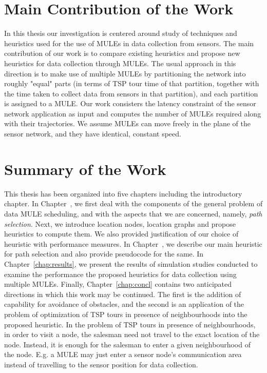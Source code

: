 \section{Main Contribution of the Work}
In this thesis our investigation is centered around study of techniques and heuristics used for the use of MULEs in data collection from sensors. The main contribution of our work is to compare existing heuristics and propose new heuristics for data collection through MULEs. The usual approach in this direction is to make use of multiple MULEs by partitioning the network into roughly "equal" parts (in terms of TSP tour time of that partition, together with the time taken to collect data from sensors in that partition), and each partition is assigned to a MULE. Our work consisters the latency constraint of the sensor network application as input and computes the number of MULEs required along with their trajectories. We assume MULEs can move freely in the plane of the sensor network, and they have identical, constant speed.

\section{Summary of the Work}
This thesis has been organized into five chapters including the 
introductory chapter. In Chapter~, we first deal with the components of the general problem of data MULE scheduling, and with the aspects that we are concerned, namely, {\em path selection}. Next, we introduce location nodes, location graphs and propose heuristics to compute them. We also provided justification of our choice of heuristic with performance measures. In Chapter~, we describe our main heuristic for path selection and also provide pseudocode for the same. 
In Chapter~\ref{chap:results}, we present the results of simulation studies conducted to examine the performance the proposed heuristics for data collection using multiple MULEs. Finally, 
Chapter~\ref{chap:concl} contains two anticipated directions in which this work may be continued. 
The first is the addition of capability for avoidance of obstacles, and the second is an application of the problem of optimization of TSP tours in presence of neighbourhoods into the proposed heuristic. In the problem of TSP tours in presence of neighbourhoods, in order to visit a node, the salesman need not travel to the exact location of the node. Instead, it is enough for the salesman to enter a given neighbourhood of the node. E.g. a MULE may just enter a sensor node's communication area instead of travelling to the sensor position for data collection.
